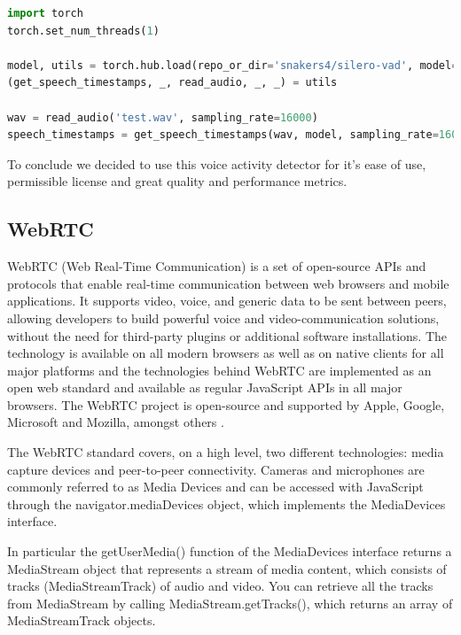 \documentclass[../main.tex]{subfiles}
\begin{document}
\begin{lstlisting}[language=Python, caption=Silero Vad usage example]
import torch
torch.set_num_threads(1)

model, utils = torch.hub.load(repo_or_dir='snakers4/silero-vad', model='silero_vad')
(get_speech_timestamps, _, read_audio, _, _) = utils

wav = read_audio('test.wav', sampling_rate=16000)
speech_timestamps = get_speech_timestamps(wav, model, sampling_rate=16000, visualize_probs=True, return_seconds=True)
\end{lstlisting}
\label{listing:silero example}

To conclude we decided to use this voice activity detector for it's ease of use, permissible license and great quality and performance metrics.  

\subsection{WebRTC}
\label{webrtc}

WebRTC (Web Real-Time Communication) is a set of open-source APIs and protocols that enable real-time communication between web browsers and mobile applications. It supports video, voice, and generic data to be sent between peers, allowing developers to build powerful voice and video-communication solutions, without the need for third-party plugins or additional software installations. The technology is available on all modern browsers as well as on native clients for all major platforms and the technologies behind WebRTC are implemented as an open web standard and available as regular JavaScript APIs in all major browsers. The WebRTC project is open-source and supported by Apple, Google, Microsoft and Mozilla, amongst others \cite{WebRTC}.

The WebRTC standard covers, on a high level, two different technologies: media capture devices and peer-to-peer connectivity. Cameras and microphones are commonly referred to as Media Devices and can be accessed with JavaScript through the navigator.mediaDevices object, which implements the MediaDevices interface. 

In particular the getUserMedia() function of the MediaDevices interface returns a MediaStream object that represents a stream of media content, which consists of tracks (MediaStreamTrack) of audio and video. You can retrieve all the tracks from MediaStream by calling MediaStream.getTracks(), which returns an array of MediaStreamTrack objects.
\end{document}
